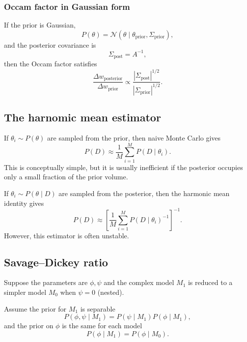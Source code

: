 \documentclass[11pt, titlepage]{article} %
\numberwithin{equation}{section}
\theoremstyle{definition}
\numberwithin{assumption}{section}
\begin{document}
\subsubsection*{Occam factor in Gaussian form}

If the prior is Gaussian,
\begin{equation*}
    P(\theta)=\mathcal{N}(\theta\mid \theta_{\mathrm{prior}},\Sigma_{\mathrm{prior}}),
\end{equation*}
and the posterior covariance is
\begin{equation*}
    \Sigma_{\mathrm{post}}=A^{-1},
\end{equation*}
then the Occam factor satisfies
\begin{equation*}
     \frac{\Delta w_{\mathrm{posterior}}}{\Delta w_{\mathrm{prior}}}\propto\frac{|\Sigma_{\mathrm{post}}|^{1/2}}{|\Sigma_{\mathrm{prior}}|^{1/2}}.
\end{equation*}




\subsection{The harnomic mean estimator}

If $\theta_i\sim P(\theta)$ are sampled from the prior, then naive Monte Carlo gives
\begin{equation*}
    P(D)\approx \frac{1}{M}\sum_{i=1}^M P(D\mid \theta_i).
\end{equation*}
This is conceptually simple, but it is usually inefficient if the posterior occupies only a small fraction of the prior volume.

If $\theta_i\sim P(\theta\mid D)$ are sampled from the posterior, then the harmonic mean identity gives
\begin{equation*}
    P(D)\approx
    \left[
    \frac{1}{M}\sum_{i=1}^M P(D\mid \theta_i)^{-1}
    \right]^{-1}.
\end{equation*}
However, this estimator is often unstable.

\subsection{Savage--Dickey ratio}

Suppose the parameters are $\phi,\psi$ and the complex model $M_1$ is reduced to a simpler model $M_0$ when $\psi=0$ (nested).

Assume the prior for $M_1$ is separable
\begin{equation*}
    P(\phi,\psi\mid M_1)=P(\psi\mid M_1)P(\phi\mid M_1),
\end{equation*}
and the prior on $\phi$ is the same for each model
\begin{equation*}
    P(\phi\mid M_1)=P(\phi\mid M_0).
\end{equation*}
\end{document}
